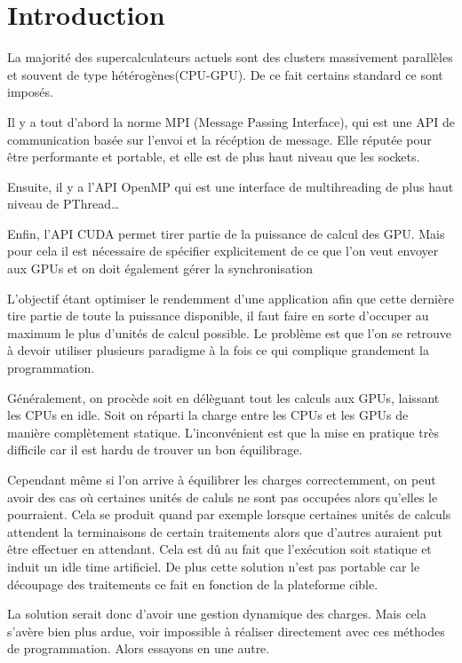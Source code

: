 \documentclass[smallextended]{svjour3}
\begin{document}
\section{Introduction}
\label{sec-1}

La majorité des supercalculateurs actuels sont des clusters
massivement parallèles et souvent de type hétérogènes(CPU-GPU). De
ce fait certains standard ce sont imposés. 

Il y a tout d'abord la norme MPI (Message Passing Interface),
qui est une API de communication basée sur l'envoi et la
récéption de message. Elle réputée pour être performante et
portable, et elle est de plus haut niveau que les sockets.

Ensuite, il y a l'API OpenMP qui est une interface de
multihreading de plus haut niveau de PThread\ldots{}

Enfin, l'API CUDA permet tirer partie de la puissance de calcul
des GPU. Mais pour cela il est nécessaire de spécifier
explicitement de ce que l'on veut envoyer aux GPUs et on doit
également gérer la synchronisation 

L'objectif étant optimiser le rendemment d'une application afin que
cette dernière tire partie de toute la puissance disponible, il faut 
faire en sorte d'occuper au maximum le plus d'unités de calcul possible.
Le problème est que l'on se retrouve à devoir utiliser plusieurs
paradigme à la fois ce qui complique grandement la
programmation.

Généralement, on procède soit en délèguant tout les calculs aux
GPUs, laissant les CPUs en idle. Soit on réparti la charge entre les
CPUs et les GPUs de manière complètement statique. L'inconvénient
est que la mise en pratique très difficile car il est hardu de
trouver un bon équilibrage.

Cependant même si l'on arrive à équilibrer les charges
correctemment, on peut avoir des cas où certaines unités de
caluls ne sont pas occupées alors qu'elles le pourraient. Cela se
produit quand par exemple lorsque certaines unités de calculs
attendent la terminaisons de certain traitements alors que
d'autres auraient put être effectuer en attendant. Cela est dû au
fait que l'exécution soit statique et induit un idle time
artificiel. De plus cette solution n'est pas portable car le
découpage des traitements ce fait en fonction de la plateforme
cible.

La solution serait donc d'avoir une gestion dynamique des
charges. Mais cela s'avère bien plus ardue, voir impossible
à réaliser directement avec ces méthodes de programmation. Alors
essayons en une autre.
\end{document}

